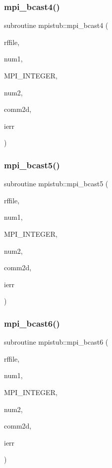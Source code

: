 \mbox{\label{namespacempistub_abe276f0cf456de80ee888e6b335a4b7d}} 
\subsubsection{\texorpdfstring{mpi\_bcast4()}{mpi\_bcast4()}}
{\footnotesize\ttfamily subroutine mpistub\+::mpi\+\_\+bcast4 (\begin{DoxyParamCaption}\item[{integer}]{rffile,  }\item[{}]{num1,  }\item[{}]{M\+P\+I\+\_\+\+I\+N\+T\+E\+G\+ER,  }\item[{}]{num2,  }\item[{integer}]{comm2d,  }\item[{}]{ierr }\end{DoxyParamCaption})}

\mbox{\label{namespacempistub_a79437cd731fca94bcf720d8abd6cec77}} 
\subsubsection{\texorpdfstring{mpi\_bcast5()}{mpi\_bcast5()}}
{\footnotesize\ttfamily subroutine mpistub\+::mpi\+\_\+bcast5 (\begin{DoxyParamCaption}\item[{double precision, dimension(\+:,\+:)}]{rffile,  }\item[{}]{num1,  }\item[{}]{M\+P\+I\+\_\+\+I\+N\+T\+E\+G\+ER,  }\item[{}]{num2,  }\item[{integer}]{comm2d,  }\item[{}]{ierr }\end{DoxyParamCaption})}

\mbox{\label{namespacempistub_aca21309e40e0374a92a5e2a163110d1c}} 
\subsubsection{\texorpdfstring{mpi\_bcast6()}{mpi\_bcast6()}}
{\footnotesize\ttfamily subroutine mpistub\+::mpi\+\_\+bcast6 (\begin{DoxyParamCaption}\item[{double precision, dimension(\+:,\+:,\+:)}]{rffile,  }\item[{}]{num1,  }\item[{}]{M\+P\+I\+\_\+\+I\+N\+T\+E\+G\+ER,  }\item[{}]{num2,  }\item[{integer}]{comm2d,  }\item[{}]{ierr }\end{DoxyParamCaption})}

